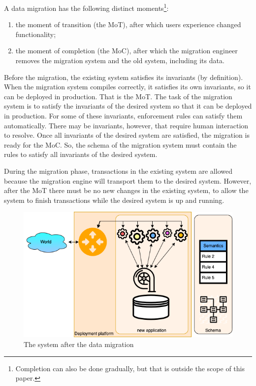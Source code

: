 \documentclass[runningheads]{llncs}
\begin{document}
   A data migration has the following distinct moments\footnote{Completion can also be done gradually, but that is outside the scope of this paper.}:
\begin{enumerate}
   \item the moment of transition (the MoT), after which users experience changed functionality;
   \item the moment of completion (the MoC), after which the migration engineer removes the migration system and the old system, including its data.
\end{enumerate}

   Before the migration, the existing system satisfies its invariants (by definition).
   When the migration system compiles correctly, it satisfies its own invariants,
   so it can be deployed in production.
   That is the MoT.
   The task of the migration system is to satisfy the invariants of the desired system
   so that it can be deployed in production.
   For some of these invariants, enforcement rules can satisfy them automatically.
   There may be invariants, however, that require human interaction to resolve.
   Once all invariants of the desired system are satisfied, the migration is ready for the MoC.
   So, the schema of the migration system must contain the rules to satisfy all invariants of the desired system.

   During the migration phase, transactions in the existing system are allowed because the migration engine will transport them to the desired system.
   However, after the MoT there must be no new changes in the existing system,
   to allow the system to finish transactions while the desired system is up and running.
   
\begin{figure}[bht]
   \begin{center}
     \includegraphics[scale=.35]{figures/datamigration-Post-migration.png}
   \end{center}
\caption{The system after the data migration}
\label{fig:post-migration}
\end{figure}
\end{document}
